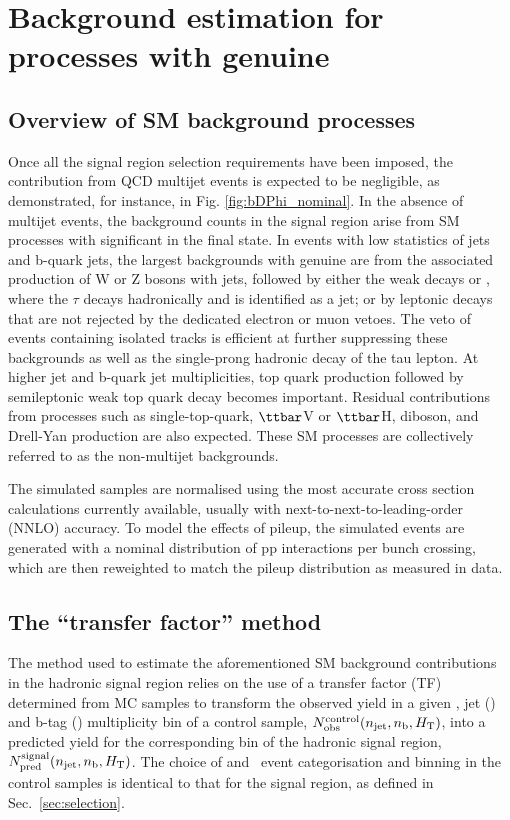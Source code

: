 
\section{Background estimation for processes with genuine \met}
\label{sec:backgroundmet}
\subsection{Overview of SM background processes}

Once all the signal region selection requirements have been imposed,
the contribution from QCD multijet events is expected to be
negligible, as demonstrated, for instance, in Fig. \ref{fig:bDPhi_nominal}. In the absence of
multijet events, the background counts in the signal region arise from
SM processes with significant \met in the final state. In events with
low statistics of jets and b-quark jets, the largest backgrounds with
genuine \met are from the associated production of W or Z bosons with
jets, followed by either the weak decays \znunu or \wtaunu, where the
$\tau$ decays hadronically and is identified as a jet; or by leptonic
decays that are not rejected by the dedicated electron or muon
vetoes. The veto of events containing isolated tracks is efficient at
further suppressing these backgrounds as well as the single-prong
hadronic decay of the tau lepton. At higher jet and b-quark jet
multiplicities, top quark production followed by semileptonic weak top
quark decay becomes important.  Residual contributions from processes
such as single-top-quark, $\ttbar$V or $\ttbar$H, diboson, and
Drell-Yan production are also expected. These SM processes are
collectively referred to as the non-multijet backgrounds.

The simulated samples are normalised using the most accurate cross
section calculations currently available, usually with
next-to-next-to-leading-order (NNLO) accuracy. To model the effects of
pileup, the simulated events are generated with a nominal distribution
of pp interactions per bunch crossing, which are then reweighted
to match the pileup distribution as measured in data. 

\subsection{The ``transfer factor'' method}
\label{sec:ewk-method}

The method used to estimate the aforementioned SM background
contributions in the hadronic signal region relies on the use of a
transfer factor (TF) determined from MC samples to transform the
observed yield in a given \scalht, jet (\njet) and b-tag (\nb)
multiplicity bin of a control sample, $N_{\textrm{obs}}^{\rm
  control}(n_{\text{jet}},n_{\text{b}},\mbox{$H_\text{T}$})$, into a predicted yield for the
corresponding bin of the hadronic signal region, $N_{\textrm{pred}}^{\rm
  signal}(n_{\text{jet}},n_{\text{b}},\mbox{$H_\text{T}$})$. The choice of \njet and \nb~event
categorisation and \scalht binning in the control samples is identical
to that for the signal region, as defined in
Sec.~\ref{sec:selection}. 

